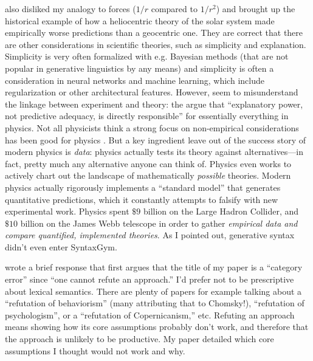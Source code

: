 \documentclass[output=paper,colorlinks,citecolor=brown
]{langscibook}
\begin{document}
\cite{rawski2023modern} also disliked my analogy to forces ($1/r$ compared to $1/r^2$) and brought up the historical example of how a heliocentric theory of the solar system made empirically worse predictions than a geocentric one. They are correct that there are other considerations in scientific theories, such as simplicity and explanation. Simplicity is very often formalized with e.g. Bayesian methods (that are not popular in generative linguistics by any means) and simplicity is often a consideration in neural networks and machine learning, which include regularization or other architectural features. However, \cite{rawski2023modern} seem to misunderstand the linkage between experiment and theory: the argue that ``explanatory power, not predictive adequacy, is directly responsible'' for essentially everything in physics. Not all physicists think a strong focus on non-empirical considerations has been good for physics \citep{hossenfelder2018lost}. But a key ingredient \cite{rawski2023modern} leave out of the success story of modern physics is \emph{data}: physics actually tests its theory against alternatives---in fact, pretty much any alternative anyone can think of. Physics even works to actively chart out the landscape of mathematically \emph{possible} theories. Modern physics actually rigorously implements a ``standard model'' that generates quantitative predictions, which it constantly attempts to falsify with new experimental work. Physics spent $\$9$ billion on the Large Hadron Collider, and $\$10$ billion on the James Webb telescope in order to gather \emph{empirical data and compare quantified, implemented theories}. As I pointed out, generative syntax didn't even enter SyntaxGym.  %

\cite{milway2023response} wrote a brief response that first argues that the title of my paper is a ``category error'' since ``one cannot refute an approach.'' I'd prefer not to be prescriptive about lexical semantics. There are plenty of papers for example talking about a ``refutation of behaviorism'' (many attributing that to Chomsky!), ``refutation of psychologism'', or a ``refutation of Copernicanism,'' etc. Refuting an approach means showing how its core assumptions probably don't work, and therefore that the approach is unlikely to be productive. My paper detailed which core assumptions I thought would not work and why. 
\end{document}
